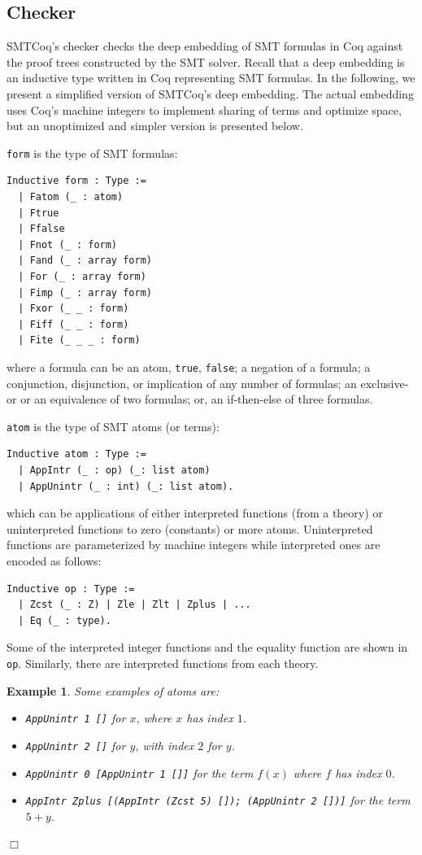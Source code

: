 \documentclass[11pt]{article}
\newtheorem{example}{Example}[section]
\begin{document}
	\subsection{Checker}
	\label{sec:checker}
	SMTCoq's checker checks the deep embedding
	of SMT formulas in Coq against the 
	proof trees constructed by the SMT solver.
	Recall that a deep embedding is an
	inductive type written in 
	Coq representing SMT formulas. 
	In the following, we present 
	a simplified version of SMTCoq's 
	deep embedding. The actual embedding 
	uses Coq's machine integers to 
	implement sharing of terms and 
	optimize space, but an unoptimized 
	and simpler version is presented 
	below. 
	
	\medskip
	
	\noindent \texttt{form} is the type of 
	SMT formulas:
	\begin{verbatim}
Inductive form : Type :=
  | Fatom (_ : atom)
  | Ftrue
  | Ffalse
  | Fnot (_ : form)
  | Fand (_ : array form)
  | For (_ : array form)
  | Fimp (_ : array form)
  | Fxor (_ _ : form)
  | Fiff (_ _ : form)
  | Fite (_ _ _ : form)
	\end{verbatim}
	where a formula can be an atom, 
	\texttt{true}, \texttt{false};
	a negation of a formula; a 
	conjunction, disjunction, or 
	implication of any number of
	formulas; an exclusive-or or
	an equivalence of two formulas; 
	or, an if-then-else of three formulas.
	
	\medskip
	
	\noindent \texttt{atom} is the type of SMT atoms
	(or terms):
	\begin{verbatim}
Inductive atom : Type :=
  | AppIntr (_ : op) (_: list atom)
  | AppUnintr (_ : int) (_: list atom).	
	\end{verbatim} 
	which can be applications of 
	either interpreted functions 
	(from a theory) or uninterpreted
	functions to zero (constants) or more 
	atoms. Uninterpreted functions 
	are parameterized by machine 
	integers while interpreted ones 
	are encoded as follows:
	\begin{verbatim}
Inductive op : Type :=
  | Zcst (_ : Z) | Zle | Zlt | Zplus | ...
  | Eq (_ : type).
	\end{verbatim}
	Some of the interpreted integer 
	functions and the equality function 
	are shown in \texttt{op}.
	Similarly, there are interpreted 
	functions from each theory.
	
	\begin{example}
		\label{ex:deepatoms}
		\em Some examples of atoms are:
		\begin{itemize}
			\item \texttt{AppUnintr	1 []} for $x$,
			where $x$ has index $1$.
			\item \texttt{AppUnintr 2 []} for $y$,
			with index $2$ for $y$.
			\item \texttt{AppUnintr 0 [AppUnintr 
				1 []]} for the term $f(x)$ where 
			$f$ has index $0$.
			\item \texttt{AppIntr Zplus [(AppIntr 
				(Zcst 5) []); (AppUnintr 2 [])]} 
			for the term $5 + y$.
		\end{itemize} \hfill $\Box$
	\end{example}
	
\end{document}
